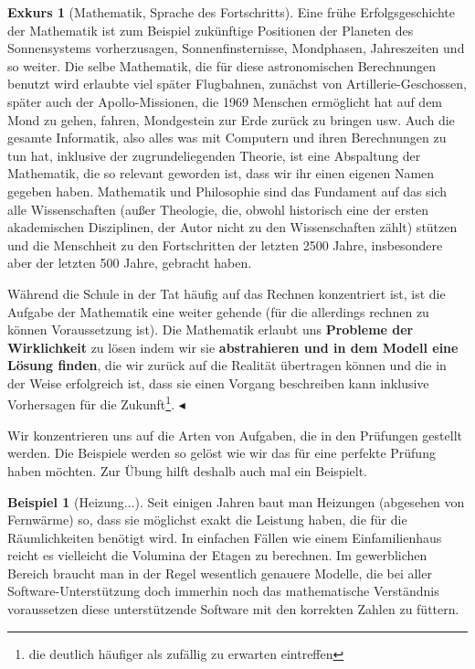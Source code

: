 \documentclass[a4paper]{book}%
\newcommand{\topicend}{
      $\blacktriangleleft$
}
\theoremstyle{definition}
\newtheorem{beispiel}{Beispiel}
\newtheorem{exkurs}{Exkurs}
\begin{document}
\begin{exkurs}[Mathematik, Sprache des Fortschritts]
    Eine frühe Erfolgsgeschichte der Mathematik ist zum Beispiel zukünftige Positionen der Planeten des Sonnensystems vorherzusagen, Sonnenfinsternisse, Mondphasen, Jahreszeiten und so weiter. Die selbe Mathematik, die für diese astronomischen Berechnungen benutzt wird erlaubte viel später Flugbahnen, zunächst von Artillerie-Geschossen, später auch der Apollo-Missionen, die 1969 Menschen ermöglicht hat auf dem Mond zu gehen, fahren, Mondgestein zur Erde zurück zu bringen usw. Auch die gesamte Informatik, also alles was mit Computern und ihren Berechnungen zu tun hat, inklusive der zugrundeliegenden Theorie, ist eine Abspaltung der Mathematik, die so relevant geworden ist, dass wir ihr einen eigenen Namen gegeben haben. Mathematik und Philosophie sind das Fundament auf das sich alle Wissenschaften (außer Theologie, die, obwohl historisch eine der ersten akademischen Disziplinen, der Autor nicht zu den Wissenschaften zählt) stützen und die Menschheit zu den Fortschritten der letzten 2500 Jahre, insbesondere aber der letzten 500 Jahre, gebracht haben.

    Während die Schule in der Tat häufig auf das Rechnen konzentriert ist, ist die Aufgabe der Mathematik eine weiter gehende (für die allerdings rechnen zu können Voraussetzung ist). Die Mathematik erlaubt uns \textbf{Probleme der Wirklichkeit} zu lösen indem wir sie \textbf{abstrahieren und in dem Modell eine Lösung finden}, die wir zurück auf die Realität übertragen können und die in der Weise erfolgreich ist, dass sie einen Vorgang beschreiben kann inklusive Vorhersagen für die Zukunft\footnote{die deutlich häufiger als zufällig zu erwarten eintreffen}.\topicend
\end{exkurs}

Wir konzentrieren uns auf die Arten von Aufgaben, die in den Prüfungen gestellt werden. Die Beispiele werden so gelöst wie wir das für eine perfekte Prüfung haben möchten. Zur Übung hilft deshalb auch mal ein Beispielt.

\begin{beispiel}[Heizung...]
    Seit einigen Jahren baut man Heizungen (abgesehen von Fernwärme) so, dass sie möglichst exakt die Leistung haben, die für die Räumlichkeiten benötigt wird. In einfachen Fällen wie einem Einfamilienhaus reicht es vielleicht die Volumina der Etagen zu berechnen. Im gewerblichen Bereich braucht man in der Regel wesentlich genauere Modelle, die bei aller Software-Unterstützung doch immerhin noch das mathematische Verständnis voraussetzen diese unterstützende Software mit den korrekten Zahlen zu füttern.
\end{beispiel}
\end{document}
